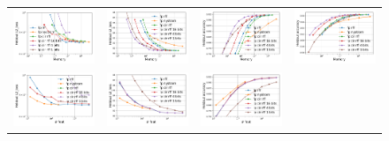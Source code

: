 \begin{figure}
	\centering
	\begin{tabular}{c@{\hskip 0in}c@{\hskip 0in}c@{\hskip 0in}c}
		\includegraphics[width=0.3\linewidth]{figures/census_L2_loss_vs_n_memory.pdf} &
		\includegraphics[width=0.3\linewidth]{figures/yearpred_L2_loss_vs_n_memory.pdf} &
		\includegraphics[width=0.3\linewidth]{figures/covtype_accuracy_vs_n_memory.pdf} &
		\includegraphics[width=0.3\linewidth]{figures/timit_accuracy_vs_n_memory.pdf} \\
		\includegraphics[width=0.3\linewidth]{figures/census_L2_loss_vs_n_feat.pdf} &
		\includegraphics[width=0.3\linewidth]{figures/yearpred_L2_loss_vs_n_feat.pdf} &
		\includegraphics[width=0.3\linewidth]{figures/covtype_accuracy_vs_n_feat.pdf} &

\end{tabular}
\end{figure}
